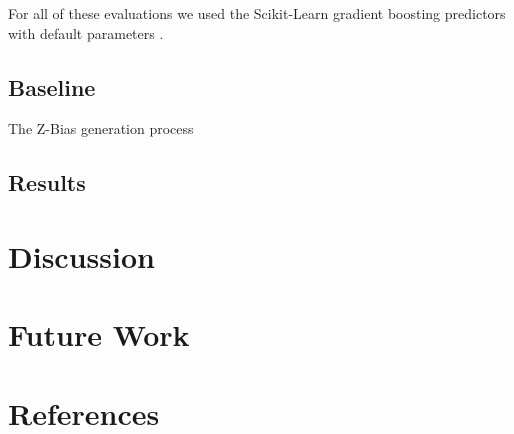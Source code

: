 \documentclass{article}
\begin{document}
For all of these evaluations we used the Scikit-Learn gradient boosting predictors with default parameters \cite{scikit-learn}. 

\subsection{Baseline}



The Z-Bias generation process \cite{myers2011effects}

\subsection{Results}


\section{Discussion}

\section{Future Work}

\section{References}



\end{document}
